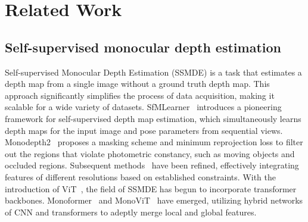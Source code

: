 \section{Related Work}
\label{sec:related_work}

\subsection{Self-supervised monocular depth estimation}
\label{sec:rel_selsupmono}
Self-supervised Monocular Depth Estimation (SSMDE) is a task that estimates a depth map from a single image without a ground truth depth map.
This approach significantly simplifies the process of data acquisition, making it scalable for a wide variety of datasets. 
SfMLearner~\citep{zhou2017unsupervised} introduces a pioneering framework for self-supervised depth map estimation, which simultaneously learns depth maps for the input image and pose parameters from sequential views.
Monodepth2~\citep{godard2019digging} proposes a masking scheme and minimum reprojection loss to filter out the regions that violate photometric constancy, such as moving objects and occluded regions.
Subsequent methods~\citep{zhou2021self, guizilini20203d, lyu2021hr} have been refined, effectively integrating features of different resolutions based on established constraints.
With the introduction of ViT~\citep{dosovitskiy2020image}, the field of SSMDE has begun to incorporate transformer backbones. 
Monoformer~\citep{bae2023deep} and MonoViT~\citep{zhao2022monovit} have emerged, utilizing hybrid networks of CNN and transformers to adeptly merge local and global features.

